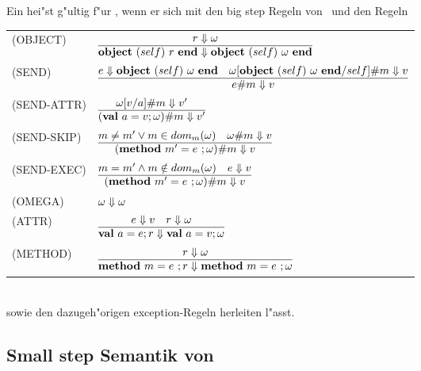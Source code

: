 Ein  hei"st g"ultig f"ur \LTWOO, wenn er sich mit den big step Regeln von \LTWO\ und den Regeln\\[3mm]
  \begin{tabular}{ll}
    \mbox{(OBJECT)}      & $\regel{r \eval \omega}
                                  {\object{self}{r} \eval \object{self}{\omega}}$ \\[5mm]
    \mbox{(SEND)}        & $\regel{e \eval \object{self}{\omega} \quad 
                                     \send{\omega [\object{self}{\omega}/self]}{m} \eval v}
                                  {\send{e}{m} \eval v}$ \\[5mm]
    \mbox{(SEND-ATTR)}   & $\regel{\send{\omega[v/a]}{m} \eval v'}
                                  {\send{(\attr{a}{v}\omega)}{m} \eval v'}$ \\[5mm]
    \mbox{(SEND-SKIP)}   & $\regel{m \neq m' \vee m \in dom_m(\omega) \quad
                                   \send{\omega}{m} \eval v}
                                  {\send{(\method{m'}{e}\omega)}{m} \eval v}$ \\[5mm]
    \mbox{(SEND-EXEC)}   & $\regel{m = m' \wedge m \notin dom_m(\omega) \quad e \eval v}
                                  {\send{(\method{m'}{e}\omega)}{m} \eval v}$ \\[5mm]
    \mbox{(OMEGA)}       & $\omega \Downarrow \omega$ \\[3mm]
    \mbox{(ATTR)}        & $\regel{e \eval v \quad r \eval \omega}
                                  {\attr{a}{e}r \eval \attr{a}{v}\omega}$ \\[5mm]
    \mbox{(METHOD)}      & $\regel{r \eval \omega}
                                  {\method{m}{e}r \eval \method{m}{e}\omega}$
  \end{tabular}\\[7mm]
sowie den dazugeh"origen exception-Regeln herleiten l"asst.


\subsection{Small step Semantik von \LTWOO}

